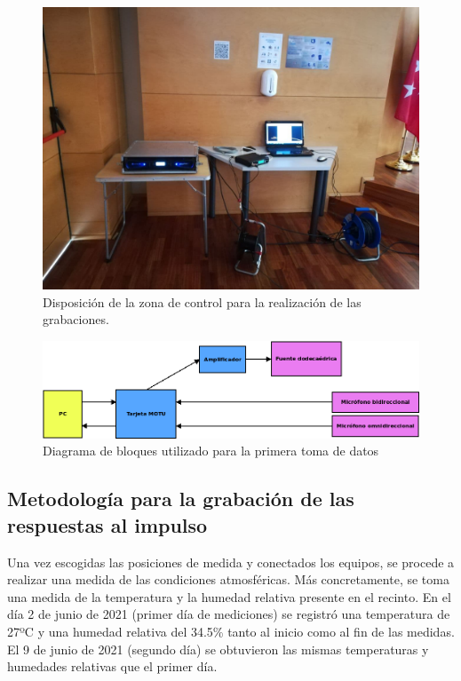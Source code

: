 \documentclass[11pt,a4paper,twoside]{book}
\begin{document}
	        \begin{figure}
	            \includegraphics[scale=0.4]{../imagenes/control.jpg}
			    \centering
			    \caption{Disposición de la zona de control para la realización de las grabaciones.}
			    \label{fig:control}
	        \end{figure}
	        
	        \begin{figure}
	            \includegraphics[scale=0.5]{../imagenes/diagrama_bloques1.png}
			    \centering
			    \caption{Diagrama de bloques utilizado para la primera toma de datos}
			    \label{fig:bloques1}
	        \end{figure}
	    
        \subsection{Metodología para la grabación de las respuestas al impulso}
            Una vez escogidas las posiciones de medida y conectados los equipos, se procede a realizar una medida de las condiciones atmosféricas. Más concretamente, se toma una medida de la temperatura y la humedad relativa presente en el recinto. En el día 2 de junio de 2021 (primer día de mediciones) se registró una temperatura de 27ºC y una humedad relativa del 34.5\% tanto al inicio como al fin de las medidas. El 9 de junio de 2021 (segundo día) se obtuvieron las mismas temperaturas y humedades relativas que el primer día.
        
\end{document}
